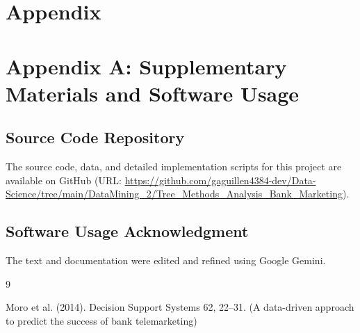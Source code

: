 \documentclass[conference]{IEEEtran}
\begin{document}
\section*{\textbf{Appendix}}
	
\section*{Appendix A: Supplementary Materials and Software Usage}
\subsection*{Source Code Repository \label{app:code}}
The source code, data, and detailed implementation scripts for this project are available on GitHub (URL: \url{https://github.com/gaguillen4384-dev/Data-Science/tree/main/DataMining_2/Tree_Methods_Analysis_Bank_Marketing}).

\subsection*{Software Usage Acknowledgment}
The text and documentation were edited and refined using Google Gemini.

\begin{thebibliography}{9} %
	
Moro et al. (2014). Decision Support Systems 62, 22--31. (A data-driven approach to predict the success of bank telemarketing)
	
\end{thebibliography}

\vspace{12pt}
\end{document}
